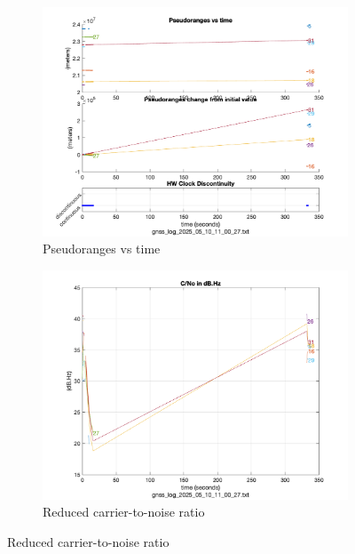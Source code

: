        \begin{figure}[h!]
            \centering
            \begin{subfigure}{0.23\textwidth}
                \includegraphics[width=\textwidth]{images/tests/Monte_Cappuccini/Interferences/Samsung_A51_Monte_Cappuccini_interference_fig1.png}
                \caption{Pseudoranges vs time}
                \label{fig:interference_pr}
            \end{subfigure}
            \hfill
            \begin{subfigure}{0.23\textwidth}
                \includegraphics[width=\textwidth]{images/tests/Monte_Cappuccini/Interferences/Samsung_A51_Monte_Cappuccini_interference_fig3.png}
                \caption{Reduced carrier-to-noise ratio}

\end{subfigure}
\end{figure}
